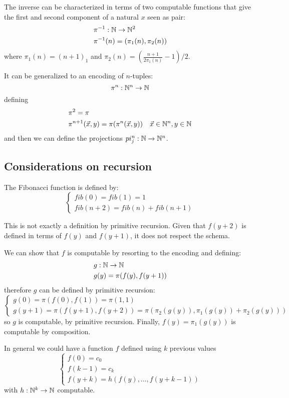 The inverse can be characterized in terms of two computable functions that give the first and second component of a natural $x$ seen as pair:
\begin{align*}
  & \pi^{-1}:\mathbb{N}\rightarrow\mathbb{N}^2 \\
  & \pi^{-1}(n) = (\pi_1(n),\pi_2(n))
\end{align*}
where $\pi_1(n) = (n+1)_1$ and 
$\pi_2(n) = (\frac{n+1}{2\pi_1(n)}-1)/2$.

It can be generalized to an encoding of $n$-tuples:
\[
  \pi^n: \mathbb{N}^n\to\mathbb{N}
\]
defining
\begin{align*}
  & \pi^2 = \pi \\
  & \pi^{n+1}(\vec{x},y) = \pi(\pi^n(\vec{x},y)) \quad \vec{x} \in \mathbb{N}^n, y \in \mathbb{N}
\end{align*}
and then we can define the projections $pi_j^n:\mathbb{N}\rightarrow\mathbb{N}^n$.

\subsection{Considerations on recursion}
The Fibonacci function is defined by:
\[
  \begin{cases}
    fib(0) = fib(1) = 1 \\
    fib(n+2) = fib(n) + fib(n+1)
  \end{cases}
\]

This is not exactly a definition by primitive recursion. Given that $f(y+2)$ is defined in terms of $f(y)$ and $f(y+1)$, it does not respect the schema.

We can show that $f$ is computable by resorting to the encoding and defining:
\begin{align*}
  & g:\mathbb{N}\rightarrow\mathbb{N} \\
  & g(y) = \pi(f(y),f(y+1))
\end{align*}
therefore $g$ can be defined by primitive recursion:
\[
  \begin{cases}
       g(0) =  \pi(f(0),f(1)) = \pi(1,1)\\
       g(y+1)  = \pi(f(y+1),f(y+2)) 
                = \pi(\pi_2(g(y)), \pi_1(g(y)) + \pi_2(g(y)))
  \end{cases}
\]
so $g$ is computable, by primitive recursion.
Finally, $f(y) = \pi_1(g(y))$ is computable by composition.

In general we could have a function $f$ defined using $k$ previous values
\[
\begin{cases}
  f(0) = c_0   \\
  f(k-1) = c_k \\
  f(y+k) = h(f(y),\dots,f(y+k-1))
\end{cases}\]
with $h:\mathbb{N}^k\rightarrow\mathbb{N}$ computable.

